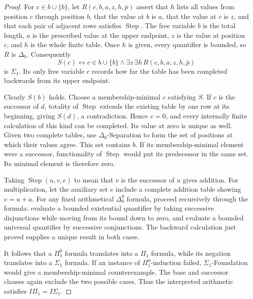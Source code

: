 \documentclass[11pt,a4paper]{article}
\theoremstyle{plain}
\theoremstyle{definition}
\theoremstyle{remark}
\begin{document}
\begin{proof}
  For \(c\in b\cup\{b\}\), let \(R(c,b,a,z,h,\bar p)\) assert that \(h\) lists all values from position \(c\) through position \(b\), that the value at \(b\) is \(a\), that the value at \(c\) is \(z\), and that each pair of adjacent rows satisfies \(\operatorname{Step}\). The free variable \(b\) is the total length, \(a\) is the prescribed value at the upper endpoint, \(z\) is the value at position \(c\), and \(h\) is the whole finite table. Once \(h\) is given, every quantifier is bounded, so \(R\) is \(\Delta_0\). Consequently
  \[
  S(c)\longleftrightarrow
  c\in b\cup\{b\}\wedge\exists z\,\exists h\,R(c,b,a,z,h,\bar p)
  \]
  is \(\Sigma_1\). Its only free variable \(c\) records how far the table has been completed backwards from its upper endpoint.

  Clearly \(S(b)\) holds. Choose a membership-minimal \(c\) satisfying \(S\). If \(c\) is the successor of \(d\), totality of \(\operatorname{Step}\) extends the existing table by one row at its beginning, giving \(S(d)\), a contradiction. Hence \(c=0\), and every internally finite calculation of this kind can be completed. Its value at zero is unique as well. Given two complete tables, use \(\Delta_0\)-Separation to form the set of positions at which their values agree. This set contains \(b\). If its membership-minimal element were a successor, functionality of \(\operatorname{Step}\) would put its predecessor in the same set. Its minimal element is therefore zero.

  Taking \(\operatorname{Step}(u,v,e)\) to mean that \(v\) is the successor of \(u\) gives addition. For multiplication, let the auxiliary set \(e\) include a complete addition table showing \(v=u+a\). For any fixed arithmetical \(\Delta_0^0\) formula, proceed recursively through the formula: evaluate a bounded existential quantifier by taking successive disjunctions while moving from its bound down to zero, and evaluate a bounded universal quantifier by successive conjunctions. The backward calculation just proved supplies a unique result in both cases.

  It follows that a \(\Pi_1^0\) formula translates into a \(\Pi_1\) formula, while its negation translates into a \(\Sigma_1\) formula. If an instance of \(\Pi_1^0\)-induction failed, \(\Sigma_1\)-Foundation would give a membership-minimal counterexample. The base and successor clauses again exclude the two possible cases. Thus the interpreted arithmetic satisfies \(I\Pi_1=I\Sigma_1\).
\end{proof}
\end{document}
